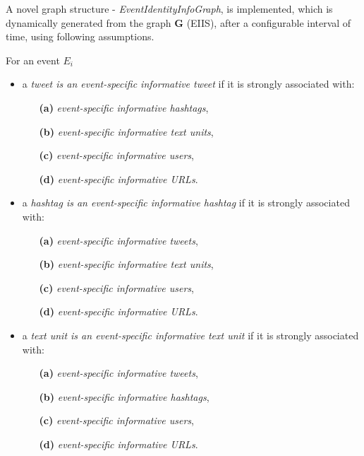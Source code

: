 A novel graph structure - \textit{EventIdentityInfoGraph}, is implemented, which is dynamically generated from the graph $\mathbf{G}$ (EIIS), after a configurable interval of time, using following assumptions.
  
For an event $E_{i}$ 
\begin{itemize} 
\item a \textit{tweet is an event-specific informative tweet} if it is strongly associated with:
\begin{itemize}
\item[\textbf{(a)}] \textit{event-specific informative hashtags}, 
\item[\textbf{(b)}] \textit{event-specific informative text units}, 
\item[\textbf{(c)}] \textit{event-specific informative users},
\item[\textbf{(d)}] \textit{event-specific informative URLs}. 
\end{itemize}
\end{itemize}

\begin{itemize} 
\item a \textit{hashtag is an event-specific informative hashtag} if it is strongly associated with:
\begin{itemize}
\item[\textbf{(a)}] \textit{event-specific informative tweets},
\item[\textbf{(b)}] \textit{event-specific informative text units},
\item[\textbf{(c)}] \textit{event-specific informative users},
\item[\textbf{(d)}] \textit{event-specific informative URLs}.
\end{itemize}
\end{itemize}

\begin{itemize} 
\item a \textit{text unit is an event-specific informative text unit} if it is strongly associated with:
\begin{itemize}
\item[\textbf{(a)}] \textit{event-specific informative tweets}, 
\item[\textbf{(b)}] \textit{event-specific informative hashtags}, 
\item[\textbf{(c)}] \textit{event-specific informative users}, 
\item[\textbf{(d)}] \textit{event-specific informative URLs}. 
\end{itemize}
\end{itemize}

